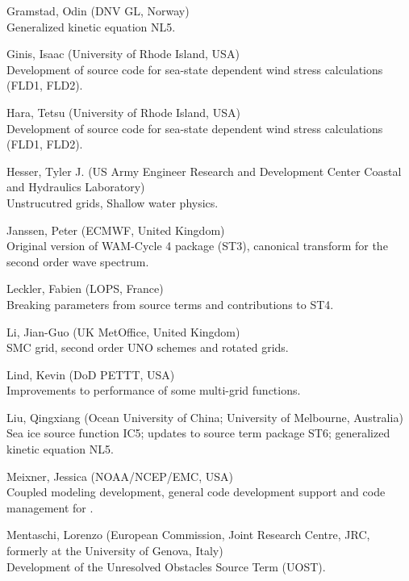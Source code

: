 \begin{list}{\ldots}{ }
\item [Gramstad, Odin] (DNV GL, Norway)\\
  Generalized kinetic equation NL5.

\item [Ginis, Isaac] (University of Rhode Island, USA) \\
  Development of source code for sea-state dependent wind stress calculations (FLD1, FLD2).

\item [Hara, Tetsu] (University of Rhode Island, USA) \\
  Development of source code for sea-state dependent wind stress calculations (FLD1, FLD2).

\item [Hesser, Tyler J.] (US Army Engineer Research and Development Center Coastal and Hydraulics Laboratory) \\
 Unstrucutred grids, Shallow water physics.

\item [Janssen, Peter] (ECMWF, United Kingdom) \\
  Original version of WAM-Cycle 4 package (ST3), canonical transform for the second order wave spectrum.

\item [Leckler, Fabien] (LOPS, France) \\
  Breaking parameters from source terms and contributions to ST4.

\item [Li, Jian-Guo] (UK MetOffice, United Kingdom) \\
  SMC grid, second order UNO schemes and rotated grids.

\item [Lind, Kevin]  (DoD PETTT, USA)\\ 
  Improvements to performance of some multi-grid functions.
 
\item [Liu, Qingxiang] (Ocean University of China; University of Melbourne, Australia)\\
  Sea ice source function IC5; updates to source term package ST6; generalized kinetic equation NL5.

\item [Meixner, Jessica] (NOAA/NCEP/EMC, USA) \\
  Coupled modeling development, general code development support and code management for \ws.
 
\item [Mentaschi, Lorenzo]  (European Commission, Joint Research Centre, JRC,
  formerly at the University of Genova, Italy)\\ 
  Development of the Unresolved Obstacles Source Term (UOST).
 

\end{list}
